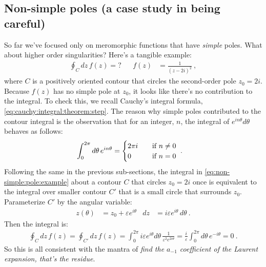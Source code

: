 \subsection{Non-simple poles (a case study in being careful)}

So far we've focused only on meromorphic functions that have \emph{simple} poles. What about higher order singularities? Here's a tangible example:
\begin{align}
	\oint_C dz \, f(z) = ?
	&&
	f(z) &= \frac{1}{(z-2i)^2} \ ,
	\label{eq:non-simple:pole:example}
\end{align}
where $C$ is a positively oriented contour that circles the second-order pole $z_0 = 2i$. Because $f(z)$ has no simple pole at $z_0$, it looks like there's no contribution to the integral. To check this, we recall Cauchy's integral formula, \eqref{eq:cauchy:integral:theorem:step}. The reason why simple poles contributed to the contour integral is the observation that for an integer,  $n$, the integral of $e^{in\theta}d\theta$ behaves as follows: 
\begin{align}
	\int_0^{2\pi}d\theta\, e^{in\theta} 
	&=
	\begin{cases}
	2\pi i & \text{\quad if } n\neq 0
	\\
	0 & \text{\quad if } n= 0
	\end{cases} \ .
\end{align}
Following the same in the previous sub-sections, the integral in \eqref{eq:non-simple:pole:example} about a contour $C$ that circles $z_0=2i$ once is equivalent to the integral over smaller contour $C'$ that is a small circle that surrounds $z_0$. Parameterize $C'$ by the angular variable:
\begin{align}
	z(\theta) &= z_0 + \varepsilon e^{i\theta} & dz &= i\varepsilon e^{i\theta} \, d\theta \ .
\end{align}
Then the integral is:
\begin{align}
	\oint_C dz\, f(z) 
	= 
	\oint_{C'} dz\, f(z) 
	= 
	\int_0^{2\pi} i\varepsilon e^{i\theta} d\theta\, 
	\frac{1}{\varepsilon^2 e^{2i\theta}} 
	=
	\frac{i}{\varepsilon}
	\int_0^{2\pi} d\theta\, 
	e^{-i\theta}
	= 0 \ .
	\label{eq:non-simple:pole:eg:zero}
\end{align}
So this is all consistent with the mantra of \emph{find the $a_{-1}$ coefficient of the Laurent expansion, that's the residue}. 

